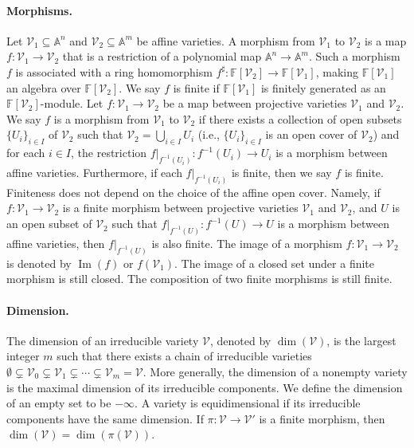 \documentclass[10pt,a4paper]{article}
\newcommand{\FF}{\mathbb F}
\newcommand{\Aspace}{\mathbb A}
\begin{document}
\paragraph{Morphisms.}
Let $\mathcal V_1\subseteq\Aspace^n$ and $\mathcal V_2\subseteq\Aspace^m$ be affine varieties. A morphism from $\mathcal V_1$ to $\mathcal V_2$ is a map $f:\mathcal V_1\to\mathcal V_2$ that is a restriction of a polynomial map $\Aspace^n\to\Aspace^m$. Such a morphism $f$ is associated with a ring homomorphism $f^\sharp:\FF[\mathcal V_2]\to\FF[\mathcal V_1]$, making $\FF[\mathcal V_1]$ an algebra over $\FF[\mathcal V_2]$. We say $f$ is finite if $\FF[\mathcal V_1]$ is finitely generated as an $\FF[\mathcal V_2]$-module.
Let $f:\mathcal V_1\to\mathcal V_2$ be a map between projective varieties $\mathcal V_1$ and $\mathcal V_2$. We say $f$ is a morphism from $\mathcal V_1$ to $\mathcal V_2$ if there exists a collection of open subsets $\{U_i\}_{i\in I}$ of $\mathcal V_2$ such that $\mathcal V_2=\bigcup_{i\in I}U_i$ (i.e., $\{U_i\}_{i\in I}$ is an open cover of $\mathcal V_2$) and for each $i\in I$, the restriction $f|_{f^{-1}(U_i)}:f^{-1}(U_i)\to U_i$ is a morphism between affine varieties. Furthermore, if each $f|_{f^{-1}(U_i)}$ is finite, then we say $f$ is finite. Finiteness does not depend on the choice of the affine open cover. Namely, if $f:\mathcal V_1\to\mathcal V_2$ is a finite morphism between projective varieties $\mathcal V_1$ and $\mathcal V_2$, and $U$ is an open subset of $\mathcal V_2$ such that $f|_{f^{-1}(U)}:f^{-1}(U)\to U$ is a morphism between affine varieties, then $f|_{f^{-1}(U)}$ is also finite.
The image of a morphism $f:\mathcal V_1\to\mathcal V_2$ is denoted by $\operatorname{Im}(f)$ or $f(\mathcal V_1)$. The image of a closed set under a finite morphism is still closed. The composition of two finite morphisms is still finite.
\paragraph{Dimension.}
The dimension of an irreducible variety $\mathcal V$, denoted by $\dim(\mathcal V)$, is the largest integer $m$ such that there exists a chain of irreducible varieties $\emptyset\subsetneq\mathcal V_0\subsetneq\mathcal V_1\subsetneq\cdots\subsetneq\mathcal V_m=\mathcal V$. More generally, the dimension of a nonempty variety is the maximal dimension of its irreducible components. We define the dimension of an empty set to be $-\infty$. A variety is equidimensional if its irreducible components have the same dimension.
If $\pi:\mathcal V\to\mathcal V'$ is a finite morphism, then $\dim(\mathcal V)=\dim(\pi(\mathcal V))$.
\end{document}
